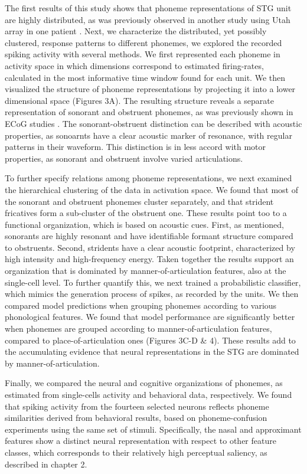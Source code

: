 The first results of this study shows that phoneme representations of STG unit are highly distributed, as was previously observed in another study using Utah array in one patient \cite{cash2015emergence}. Next, we characterize the distributed, yet possibly clustered, response patterns to different phonemes, we explored the recorded spiking activity with several methods. We first represented each phoneme in activity space in which dimensions correspond to estimated firing-rates, calculated in the most informative time window found for each unit. We then visualized the structure of phoneme representations by projecting it into a lower dimensional space (Figures 3A). The resulting structure reveals a separate representation of sonorant and obstruent phonemes, as was previously shown in ECoG studies \citep{Mesgarani2014}. The sonorant-obstruent distinction can be described with acoustic properties, as sonoarnts have a clear acoustic marker of resonance, with regular patterns in their waveform. This distinction is in less accord with motor properties, as sonorant and obstruent involve varied articulations.

To further specify relations among phoneme representations, we next examined the hierarchical clustering of the data in activation space. We found that most of the sonorant and obstruent phonemes cluster separately, and that strident fricatives form a sub-cluster of the obstruent one. These results point too to a functional organization, which is based on acoustic cues. First, as mentioned, sonorants are highly resonant and have identifiable formant structure compared to obstruents. Second, stridents have a clear acoustic footprint, characterized by high intensity and high-frequency energy. Taken together the results support an organization that is dominated by manner-of-articulation features, also at the single-cell level. To further quantify this, we next trained a probabilistic classifier, which mimics the generation process of spikes, as recorded by the units. We then compared model predictions when grouping phonemes according to various phonological features. We found that model performance are significantly better when phonemes are grouped according to manner-of-articulation features, compared to place-of-articulation ones (Figures 3C-D \& 4). These results add to the accumulating evidence that neural representations in the STG are dominated by manner-of-articulation.

Finally, we compared the neural and cognitive organizations of phonemes, as estimated from single-cells activity and behavioral data, respectively. We found that spiking activity from the fourteen selected neurons reflects phoneme similarities derived from behavioral results, based on phoneme-confusion experiments using the same set of stimuli. Specifically, the nasal and approximant features show a distinct neural representation with respect to other feature classes, which corresponds to their relatively high perceptual saliency, as described in chapter 2.

